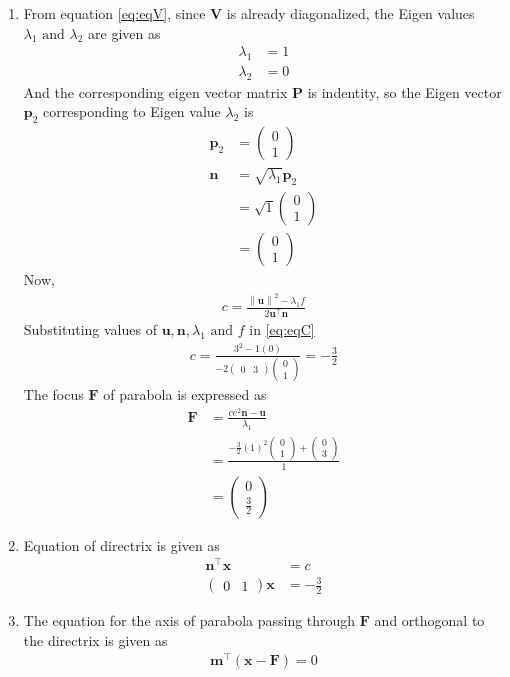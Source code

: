 \documentclass[12pt]{article}
\providecommand{\brak}[1]{\ensuremath{\left(#1\right)}}
\providecommand{\norm}[1]{\left\lVert#1\right\rVert}
\newcommand{\myvec}[1]{\ensuremath{\begin{pmatrix}#1\end{pmatrix}}}
\let\vec\mathbf
\begin{document}
\begin{enumerate}
\item From equation \eqref{eq:eqV}, since $\vec{V}$ is already diagonalized, the Eigen values $\lambda_1 \text{ and } \lambda_2$ are given as
\begin{align}
	\label{eq:eqEigen1}
	\lambda_1 &= 1\\
	\label{eq:eqEigen2}
	\lambda_2 &= 0
\end{align}
And the corresponding eigen vector matrix $\vec{P}$ is indentity, so the Eigen vector $\vec{p}_2$ corresponding to Eigen value $\lambda_2$ is
\begin{align}
	\vec{p}_2 &= \myvec{0\\1}\\
	\vec{n} &= \sqrt{\lambda_1}\vec{p}_2\\
		&= \sqrt{1}\myvec{0\\1}\\
		&= \myvec{0\\1}
\end{align}
Now,
\begin{align}
	\label{eq:eqC}
	c = \frac{\norm{\vec{u}}^2 - \lambda_1 f}{2\vec{u}^\top \vec{n}}
\end{align}
Substituting values of $\vec{u},\vec{n},\lambda_1 \text{ and } f$ in \eqref{eq:eqC}
\begin{align}
	c = \frac{3^2-1\brak{0}}{-2\myvec{0&3}\myvec{0\\1}} = -\frac{3}{2}
\end{align}
The focus $\vec{F}$ of parabola is expressed as
\begin{align}
	\vec{F} &= \frac{ce^2 \vec{n}-\vec{u}}{\lambda_1}\\
		&= \frac{-\frac{3}{2}\brak{1}^2 \myvec{0\\1}+\myvec{0\\3}}{1}\\
		&= \myvec{0\\\frac{3}{2}}
\end{align}
\item Equation of directrix is given as
\begin{align}
	\vec{n}^\top \vec{x} &= c\\
	\myvec{0&1}\vec{x} &= -\frac{3}{2}
\end{align}
\item The equation for the axis of parabola passing through $\vec{F}$ and orthogonal to the directrix is given as
\begin{align}
	\label{eq:eqM}
	\vec{m}^\top \brak{\vec{x}-\vec{F}} = 0

\end{align}
\end{enumerate}
\end{document}
